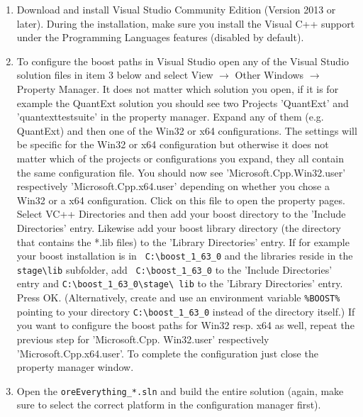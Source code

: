 \documentclass[12pt, a4paper]{article}
\newcommand{\bs}{\textbackslash}
\begin{document}
\begin{enumerate}

\item Download and install Visual Studio Community Edition (Version 2013 or later). 
During the installation, make sure you install the Visual
C++ support under the Programming Languages features (disabled by default).

\item To configure the boost paths in Visual Studio open any of the Visual Studio solution files in item 3 below and
  select View $\rightarrow$ Other Windows $\rightarrow$ Property Manager. It does not matter which solution you open, if
  it is for example the Quant\-Ext solution you should see two Projects 'QuantExt' and 'quantexttestsuite' in the property
  manager. Expand any of them (e.g. QuantExt) and then one of the Win32 or x64 configurations. The settings will be
  specific for the Win32 or x64 configuration but otherwise it does not matter which of the projects or configurations
  you expand, they all contain the same configuration file. You should now see 'Microsoft.Cpp.Win32.user' respectively
  'Microsoft.Cpp.x64.user' depending on whether you chose a Win32 or a x64 configuration. Click on this file to open the
  property pages. Select VC++ Directories and then add your boost directory to the 'Include Directories' entry. Likewise
  add your boost library directory (the directory that contains the *.lib files) to the 'Library Directories' entry. If for example your boost installation is in {\tt
    C:{\bs}boost\_1\_63\_0} and the libraries reside in the {\tt stage{\bs}lib} subfolder, add {\tt
    C:{\bs}boost\_1\_63\_0} to the 'Include Directories' entry and {\tt C:{\bs}boost\_1\_63\_0{\bs}stage{\bs} lib} to the
  'Library Directories' entry. Press OK. 
  (Alternatively, create and use an environment variable {\tt \%BOOST\%} pointing to your directory {\tt C:{\bs}boost\_1\_63\_0} instead of the directory itself.) 
  If you want to configure the boost paths for Win32 resp. x64 as well, repeat
  the previous step for 'Microsoft.Cpp. Win32.user' respectively 'Microsoft.Cpp.x64.user'. To complete the configuration
  just close the property manager window.

%
\item Open the {\tt oreEverything\_*.sln} and build the entire solution (again, make sure to select the correct platform in the configuration manager first).
\end{enumerate}
\end{document}

